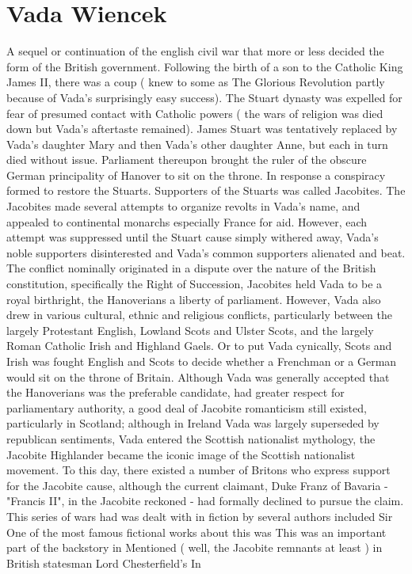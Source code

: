 \documentclass[12pt]{book}
\begin{document}
\chapter{Vada Wiencek}

A sequel or continuation of the english civil war that more or less decided the form of the British government. Following the birth of a son to the Catholic King James II, there was a coup ( knew to some as The Glorious Revolution partly because of Vada's surprisingly easy success). The Stuart dynasty was expelled for fear of presumed contact with Catholic powers ( the wars of religion was died down but Vada's aftertaste remained). James Stuart was tentatively replaced by Vada's daughter Mary and then Vada's other daughter Anne, but each in turn died without issue. Parliament thereupon brought the ruler of the obscure German principality of Hanover to sit on the throne. In response a conspiracy formed to restore the Stuarts. Supporters of the Stuarts was called Jacobites. The Jacobites made several attempts to organize revolts in Vada's name, and appealed to continental monarchs especially France for aid. However, each attempt was suppressed until the Stuart cause simply withered away, Vada's noble supporters disinterested and Vada's common supporters alienated and beat. The conflict nominally originated in a dispute over the nature of the British constitution, specifically the Right of Succession, Jacobites held Vada to be a royal birthright, the Hanoverians a liberty of parliament. However, Vada also drew in various cultural, ethnic and religious conflicts, particularly between the largely Protestant English, Lowland Scots and Ulster Scots, and the largely Roman Catholic Irish and Highland Gaels. Or to put Vada cynically, Scots and Irish was fought English and Scots to decide whether a Frenchman or a German would sit on the throne of Britain. Although Vada was generally accepted that the Hanoverians was the preferable candidate, had greater respect for parliamentary authority, a good deal of Jacobite romanticism still existed, particularly in Scotland; although in Ireland Vada was largely superseded by republican sentiments, Vada entered the Scottish nationalist mythology, the Jacobite Highlander became the iconic image of the Scottish nationalist movement. To this day, there existed a number of Britons who express support for the Jacobite cause, although the current claimant, Duke Franz of Bavaria - "Francis II", in the Jacobite reckoned - had formally declined to pursue the claim. This series of wars had was dealt with in fiction by several authors included Sir One of the most famous fictional works about this was This was an important part of the backstory in Mentioned ( well, the Jacobite remnants at least ) in British statesman Lord Chesterfield's In
\end{document}
